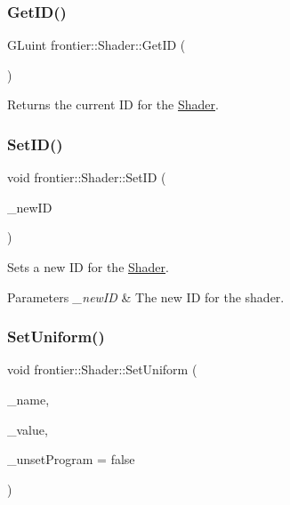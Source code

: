 \subsubsection{\texorpdfstring{Get\+I\+D()}{GetID()}}
{\footnotesize\ttfamily G\+Luint frontier\+::\+Shader\+::\+Get\+ID (\begin{DoxyParamCaption}{ }\end{DoxyParamCaption})}



Returns the current ID for the \hyperlink{classfrontier_1_1_shader}{Shader}. 

\mbox{\label{classfrontier_1_1_shader_a2485d4542cb287c9831558ed1cbd0d13}} 
\subsubsection{\texorpdfstring{Set\+I\+D()}{SetID()}}
{\footnotesize\ttfamily void frontier\+::\+Shader\+::\+Set\+ID (\begin{DoxyParamCaption}\item[{G\+Luint}]{\+\_\+new\+ID }\end{DoxyParamCaption})}



Sets a new ID for the \hyperlink{classfrontier_1_1_shader}{Shader}. 


\begin{DoxyParams}{Parameters}
{\em \+\_\+new\+ID} & The new ID for the shader. \\
\hline
\end{DoxyParams}
\mbox{\label{classfrontier_1_1_shader_ae893f9f790c70ef2abaa0f1ba58bfec1}} 
\subsubsection{\texorpdfstring{Set\+Uniform()}{SetUniform()}\hspace{0.1cm}{\footnotesize\ttfamily [1/7]}}
{\footnotesize\ttfamily void frontier\+::\+Shader\+::\+Set\+Uniform (\begin{DoxyParamCaption}\item[{const G\+Lchar $\ast$}]{\+\_\+name,  }\item[{float}]{\+\_\+value,  }\item[{bool}]{\+\_\+unset\+Program = {\ttfamily false} }\end{DoxyParamCaption})}



